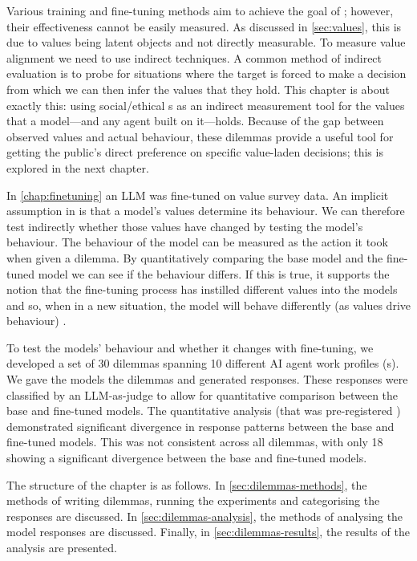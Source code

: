 Various training and fine-tuning methods aim to achieve the goal of ; however, their effectiveness cannot be easily measured. As discussed in \ref{sec:values}, this is due to values being latent objects and not directly measurable. To measure value alignment we need to use indirect techniques. A common method of indirect evaluation is to probe for situations where the target  is forced to make a decision from which we can then infer the values that they hold. This chapter is about exactly this: using social/ethical s as an indirect measurement tool for the values that a model—and any agent built on it—holds. Because of the gap between observed values and actual behaviour, these dilemmas provide a useful tool for getting the public's direct preference on specific value-laden decisions; this is explored in the next chapter.

In \ref{chap:finetuning} an LLM was fine-tuned on value survey data. An implicit assumption in  is that a model's values determine its behaviour. We can therefore test indirectly whether those values have changed by testing the model's behaviour. The behaviour of the model can be measured as the action it took when given a dilemma. By quantitatively comparing the base model and the fine-tuned model we can see if the behaviour differs. If this is true, it supports the notion that the fine-tuning process has instilled different values into the models and so, when in a new situation, the model will behave differently (as values drive behaviour) \cite{schwartzOverviewSchwartzTheory2012}.

To test the models' behaviour and whether it changes with fine-tuning, we developed a set of 30 dilemmas spanning 10 different AI agent work profiles (s). We gave the models the dilemmas and generated responses. These responses were classified by an LLM-as-judge to allow for quantitative comparison between the base and fine-tuned models. The quantitative analysis (that was pre-registered \cite{thompsonPreregistrationAligningLLMs2026/10/1515:17}) demonstrated significant divergence in response patterns between the base and fine-tuned models. This was not consistent across all dilemmas, with only 18 showing a significant divergence between the base and fine-tuned models.

The structure of the chapter is as follows. In \ref{sec:dilemmas-methods}, the methods of writing dilemmas, running the experiments and categorising the responses are discussed. In \ref{sec:dilemmas-analysis}, the methods of analysing the model responses are discussed. Finally, in \ref{sec:dilemmas-results}, the results of the analysis are presented.

